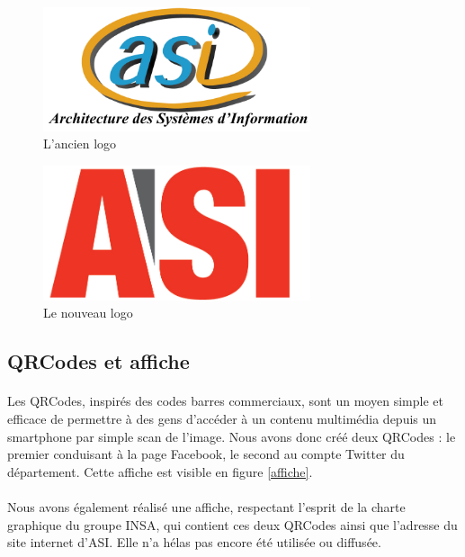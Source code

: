 		\begin{figure}
			\begin{center}
				\includegraphics[width=0.7\textwidth]{images/ancienlogo.png}
				\caption{\label{ancienlogo} L'ancien logo}
			\end{center}
		\end{figure}
		
		\begin{figure}
			\begin{center}
				\includegraphics[width=0.7\textwidth]{images/logo.jpg}
				\caption{\label{nouveaulogo} Le nouveau logo}
			\end{center}
		\end{figure}

	\subsection{QRCodes et affiche}

		\paragraph{}
		Les QRCodes, inspirés des codes barres commerciaux, sont un moyen simple et efficace de permettre à des gens d'accéder à un contenu multimédia depuis un smartphone par simple scan de l'image. 
		Nous avons donc créé deux QRCodes : le premier conduisant à la page Facebook, le second au compte Twitter du département. Cette affiche est visible en figure \ref{affiche}.
		
		\paragraph{}
		Nous avons également réalisé une affiche, respectant l'esprit de la charte graphique du groupe INSA, qui contient ces deux QRCodes ainsi que l'adresse du site internet d'ASI. Elle n'a hélas pas encore été 
		utilisée ou diffusée.

